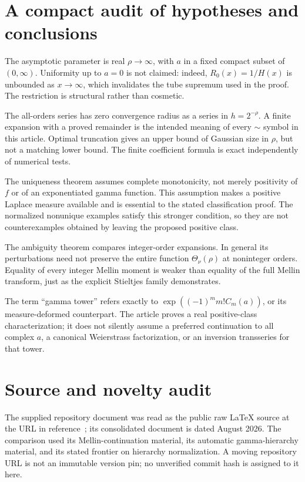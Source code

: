 \documentclass[11pt,letterpaper]{article}
\numberwithin{equation}{section}
\theoremstyle{definition}
\theoremstyle{remark}
\begin{document}
\appendix
\section{A compact audit of hypotheses and conclusions}\label{app:audit}

The asymptotic parameter is real $\rho\to\infty$, with $a$ in a fixed
compact subset of $(0,\infty)$. Uniformity up to $a=0$ is not claimed:
indeed, $R_0(x)=1/H(x)$ is unbounded as $x\to\infty$, which invalidates
the tube supremum used in the proof. The restriction is structural rather
than cosmetic.

The all-orders series has zero convergence radius as a series in
$h=2^{-\rho}$. A finite expansion with a proved remainder is the intended
meaning of every $\sim$ symbol in this article. Optimal truncation gives
an upper bound of Gaussian size in $\rho$, but not a matching lower bound.
The finite coefficient formula is exact independently of numerical tests.

The uniqueness theorem assumes complete monotonicity, not merely
positivity of $f$ or of an exponentiated gamma function. This assumption
makes a positive Laplace measure available and is essential to the stated
classification proof. The normalized nonunique examples satisfy this
stronger condition, so they are not counterexamples obtained by leaving
the proposed positive class.

The ambiguity theorem compares integer-order expansions. In general its
perturbations need not preserve the entire function
$\Theta_\nu(\rho)$ at noninteger orders. Equality of every integer Mellin
moment is weaker than equality of the full Mellin transform, just as the
explicit Stieltjes family demonstrates.

The term ``gamma tower'' refers exactly to
$\exp((-1)^m m!C_m(a))$, or its measure-deformed counterpart. The article
proves a real positive-class characterization; it does not silently assume
a preferred continuation to all complex $a$, a canonical Weierstrass
factorization, or an inversion transseries for that tower.

\section{Source and novelty audit}\label{app:sources}

The supplied repository document was read as the public raw LaTeX source
at the URL in reference~\cite{Atlas}; its consolidated document is dated
August 2026. The comparison used its Mellin-continuation material, its
automatic gamma-hierarchy material, and its stated frontier on hierarchy
normalization. A moving repository URL is not an immutable version pin;
no unverified commit hash is assigned to it here.
\end{document}
